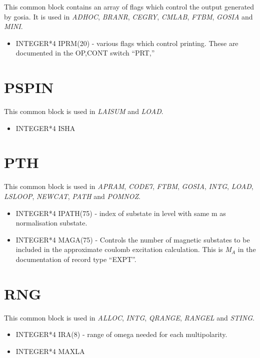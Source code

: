 This common block contains an array of flags which control the output
generated by gosia. It is used in {\em ADHOC}, {\em BRANR}, {\em CEGRY},
{\em CMLAB}, {\em FTBM}, {\em GOSIA} and {\em MINI}.

\begin{itemize}
\item INTEGER*4 IPRM(20) - various flags which control printing. These are
documented in the OP,CONT switch ``PRT,''
\end{itemize}

\section{PSPIN}

This common block is used in {\em LAISUM} and {\em LOAD}.

\begin{itemize}
\item INTEGER*4 ISHA
\end{itemize}

\section{PTH}

This common block is used in {\em APRAM}, {\em CODE7}, {\em FTBM}, {\em
GOSIA}, {\em INTG}, {\em LOAD}, {\em LSLOOP}, {\em NEWCAT}, {\em PATH} and
{\em POMNOZ}.

\begin{itemize}
\item INTEGER*4 IPATH(75) - index of substate in level with same m as
normalisation substate.
\item INTEGER*4 MAGA(75) - Controls the number of magnetic substates to be
included in the approximate coulomb excitation calculation. This is {\em
M$_A$} in the documentation of record type ``EXPT''.
\end{itemize}

\section{RNG}

This common block is used in {\em ALLOC}, {\em INTG}, {\em QRANGE}, {\em
RANGEL} and {\em STING}.

\begin{itemize}
\item INTEGER*4 IRA(8) - range of omega needed for each multipolarity.
\item INTEGER*4 MAXLA
\end{itemize}

